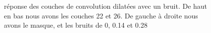 \documentclass[12pt]{article}
\begin{document}
\begin{figure}[htb]
  \hfill
  \hfill
  \hfill
  \caption{réponse des couches de convolution dilatées avec un bruit. De haut en bas nous avons les couches 22 et 26. De gauche à droite nous avons le masque, et les bruits de 0, 0.14 et 0.28}\label{fig:occlus_dynamic}
\end{figure}
\end{document}
